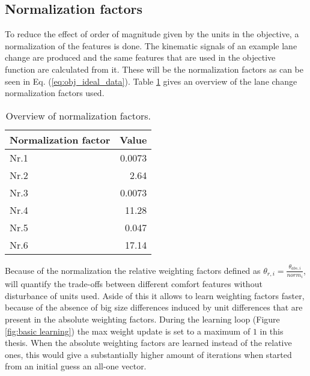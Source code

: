 \subsection{Normalization factors} \label{s:norm}
To reduce the effect of order of magnitude given by the units in the objective, a normalization of the features is done. The kinematic signals of an example lane change are produced and the same features that are used in the objective function are calculated from it. These will be the normalization factors as can be seen in Eq. (\ref{eq:obj_ideal_data}). Table \ref{table:norm} gives an overview of the lane change normalization factors used.  %


\begin{table}[h!]
  \centering
  \begin{tabular}{@{}lr@{}} 
    Normalization factor    & Value\\ \midrule
    Nr.1      & 0.0073\\
    Nr.2          & 2.64\\
    Nr.3 	   & 0.0073\\
    Nr.4       & 11.28\\
    Nr.5       & 0.047\\
    Nr.6  & 17.14\\ \bottomrule
  \end{tabular}
  \caption{Overview of  normalization factors.}
  \label{table:norm}
\end{table}

Because of the normalization the relative weighting factors defined as $\theta_{r,i} = \frac{\theta_{abs,i}}{norm_i}$, will quantify the trade-offs between different comfort features without disturbance of units used. Aside of this it allows to learn weighting factors faster, because of the absence of big size differences induced by unit differences that are present in the absolute weighting factors. During the learning loop (Figure \ref{fig:basic learning}) the max weight update is set to a maximum of $1$ in this thesis. When the absolute weighting factors are learned instead of the relative ones, this would give a substantially higher amount of iterations when started from an initial guess an all-one vector.

